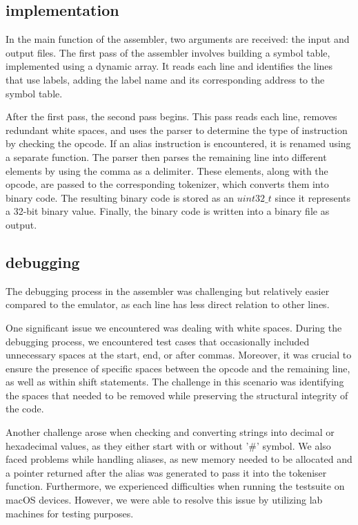 \documentclass[11pt]{article}
\begin{document}
\subsection{implementation}
In the main function of the assembler, two arguments are received: the input and output files. The first pass of the assembler involves building a symbol table, implemented using a dynamic array. It reads each line and identifies the lines that use labels, adding the label name and its corresponding address to the symbol table.

After the first pass, the second pass begins. This pass reads each line, removes redundant white spaces, and uses the parser to determine the type of instruction by checking the opcode. If an alias instruction is encountered, it is renamed using a separate function. The parser then parses the remaining line into different elements by using the comma as a delimiter. These elements, along with the opcode, are passed to the corresponding tokenizer, which converts them into binary code.  The resulting binary code is stored as an $uint32\_t$ since it represents a 32-bit binary value. Finally, the binary code is written into a binary file as output.

\subsection{debugging}
The debugging process in the assembler was challenging but relatively easier compared to the emulator, as each line has less direct relation to other lines.

One significant issue we encountered was dealing with white spaces. During the debugging process, we encountered test cases that occasionally included unnecessary spaces at the start, end, or after commas. Moreover, it was crucial to ensure the presence of specific spaces between the opcode and the remaining line, as well as within shift statements. The challenge in this scenario was identifying the spaces that needed to be removed while preserving the structural integrity of the code.

Another challenge arose when checking and converting strings into decimal or hexadecimal values, as they either start with or without '\#' symbol. We also faced problems while handling aliases, as new memory needed to be allocated and a pointer returned after the alias was generated to pass it into the tokeniser function. Furthermore, we experienced difficulties when running the testsuite on macOS devices. However, we were able to resolve this issue by utilizing lab machines for testing purposes.
\end{document}
